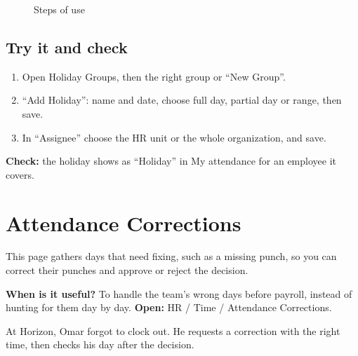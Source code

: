 \begin{figure}[H]
\centering
{}
\rclegend
\caption{Steps of use}
\label{fig:hr-feature-holiday-groups-flow}
\end{figure}

\subsection{Try it and check}

\begin{enumerate}
  \item Open Holiday Groups, then the right group or “New Group”.
  \item “Add Holiday”: name and date, choose full day, partial day or range, then save.
  \item In “Assignee” choose the HR unit or the whole organization, and save.
\end{enumerate}

\textbf{Check:} the holiday shows as “Holiday” in My attendance for an employee it covers.

\clearpage
\section{Attendance Corrections}
\label{sec:hr-feature-attendance-corrections}

This page gathers days that need fixing, such as a missing punch, so you can correct their punches and approve or reject the decision.

\textbf{When is it useful?} To handle the team's wrong days before payroll, instead of hunting for them day by day. \textbf{Open:} HR / Time / Attendance Corrections.

\begin{rcnote}
At Horizon, Omar forgot to clock out. He requests a correction with the right time, then checks his day after the decision.
\end{rcnote}

